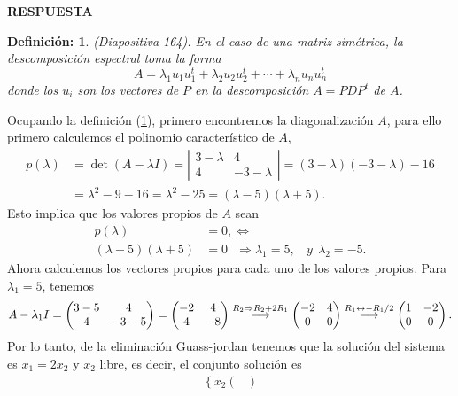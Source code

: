 \documentclass[11pt,letterpaper]{article}
\newcommand{\res}{\textbf{RESPUESTA}\\}
\newcommand{\grstep}[2][\relax]{%
   \ensuremath{\mathrel{
       {\mathop{\longrightarrow}\limits^{#2\mathstrut}_{
                                     \begin{subarray}{l} #1 \end{subarray}}}}}}
\newtheorem{thmd}{Definición:}
\begin{document}
\begin{enumerate}
\res \begin{framed}
    \begin{thmd} \label{d_espectral}
	(Diapositiva 164). En el caso de una matriz simétrica, la descomposición espectral toma la forma
	$$A=\lambda_1u_1u_1^t+\lambda_2u_2u_2^t+\cdots+\lambda_nu_nu_n^t$$
	donde los $u_i$ son los vectores de $P$ en la descomposición $A=PDP^t$ de $A$. 
	    \end{thmd}
\end{framed}
Ocupando la definición (\ref{d_espectral}), primero encontremos la diagonalización $A$, para ello primero calculemos el polinomio característico de $A$,
\begin{align*}
p(\lambda) &= \det (A-\lambda I)=
\left|\begin{array}{ccc}
3-\lambda& 4\\
4 & -3-\lambda
\end{array} \right|
=(3-\lambda)(-3-\lambda)-16\\
&=\lambda^2-9-16=\lambda^2-25=(\lambda-5)(\lambda+5).
\end{align*}
Esto implica que los valores propios de $A$ sean
\begin{align*}
p(\lambda)&=0,\Leftrightarrow\\
(\lambda-5)(\lambda+5)&=0\ \ \ \Rightarrow \lambda_1=5, \ \ \ \ y \ \ \lambda_2=-5.
\end{align*}
Ahora calculemos los vectores propios para cada uno de los valores propios. Para $\lambda_1=5$, tenemos 
\begin{align*}
A-\lambda_1I=\begin{pmatrix}
3-5& 4\\
4 & -3-5
\end{pmatrix}=\begin{pmatrix}
-2& 4\\
4 & -8
\end{pmatrix}%
\grstep[]{R_2 \Rightarrow R_2+2R_1}
%
\begin{pmatrix}
-2& 4\\
 0 & 0
\end{pmatrix}
%
\grstep[]{R_1 \leftrightarrow -R_1/2}
%
\begin{pmatrix}
1& -2\\
 0 & 0
\end{pmatrix}.
\end{align*}
Por lo tanto, de la eliminación Guass-jordan tenemos que la solución del sistema es $x_1=2x_2$ y $x_2$ libre, es decir, el conjunto solución es
\begin{align*}
\left\{x_2\begin{pmatrix}

\end{pmatrix}
\end{align*}
\end{enumerate}
\end{document}
